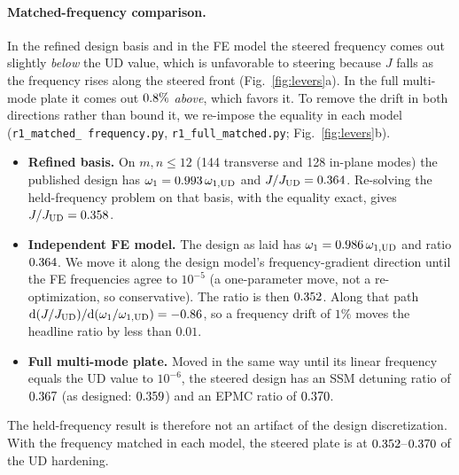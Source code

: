 \paragraph{Matched-frequency comparison.} In the refined design basis and in the FE model the steered
frequency comes out slightly \emph{below} the UD value, which is unfavorable to steering because $J$ falls
as the frequency rises along the steered front (Fig.~\ref{fig:levers}a). In the full multi-mode plate it
comes out $0.8\%$ \emph{above}, which favors it. To remove the drift in both directions rather
than bound it, we re-impose the equality in each model (\texttt{r1\_\allowbreak matched\_\allowbreak
frequency.py}, \texttt{r1\_\allowbreak full\_\allowbreak matched.py}; Fig.~\ref{fig:levers}b).
\begin{itemize}[itemsep=1pt]
\item \textbf{Refined basis.} On $m,n\le12$ (144 transverse and 128 in-plane modes) the published design
  has $\omega_1=0.993\,\omega_{1,\mathrm{UD}}$ and $J/J_{\mathrm{UD}}=0.364$. Re-solving the held-frequency
  problem on that basis, with the equality exact, gives $J/J_{\mathrm{UD}}=0.358$.
\item \textbf{Independent FE model.} The design as laid has $\omega_1=0.986\,\omega_{1,\mathrm{UD}}$ and ratio
  $0.364$. We move it along the design model's frequency-gradient direction until the FE
  frequencies agree to $10^{-5}$ (a one-parameter move, not a re-optimization, so conservative). The ratio
  is then $0.352$. Along that path
  $\mathrm{d}(J/J_{\mathrm{UD}})/\mathrm{d}(\omega_1/\omega_{1,\mathrm{UD}})=-0.86$, so a frequency drift of $1\%$ moves the
  headline ratio by less than $0.01$.
\item \textbf{Full multi-mode plate.} Moved in the same way until its linear frequency equals the UD
  value to $10^{-6}$, the steered design has an SSM detuning ratio of $0.367$ (as designed:
  $0.359$) and an EPMC ratio of $0.370$.
\end{itemize}
The held-frequency result is therefore not an artifact of the design discretization. With the
frequency matched in each model, the steered plate is at $0.352$--$0.370$ of the UD
hardening.

